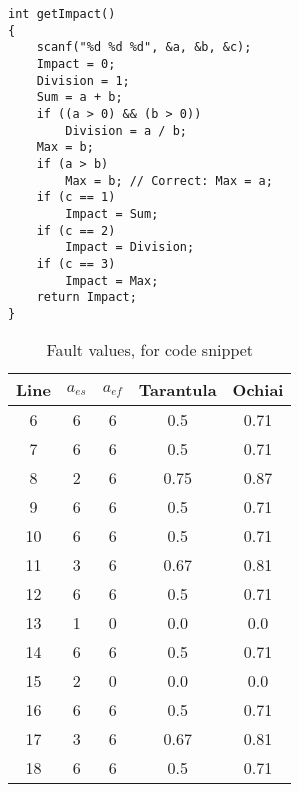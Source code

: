 \begin{lstlisting}[caption={Example code snippet}, label={lst:code_snippet sfl}]
int getImpact()
{
    scanf("%d %d %d", &a, &b, &c);
    Impact = 0;
    Division = 1;
    Sum = a + b;
    if ((a > 0) && (b > 0))
        Division = a / b;
    Max = b;
    if (a > b)
        Max = b; // Correct: Max = a;
    if (c == 1)
        Impact = Sum;
    if (c == 2)
        Impact = Division;
    if (c == 3)
        Impact = Max;
    return Impact;
}
\end{lstlisting}
\begin{table}[!h]
\centering
\begin{tabular}{|c|c|c|c|c|}
\hline
Line & $a_{es}$ & $a_{ef}$ & Tarantula & Ochiai \\
\hline
6 & 6 & 6 & 0.5 & 0.71 \\
7 & 6 & 6 & 0.5 & 0.71 \\
8 & 2 & 6 & 0.75 & 0.87 \\
9 & 6 & 6 & 0.5 & 0.71 \\
10 & 6 & 6 & 0.5 & 0.71 \\
11 & 3 & 6 & 0.67 & 0.81 \\
12 & 6 & 6 & 0.5 & 0.71 \\
13 & 1 & 0 & 0.0 & 0.0 \\
14 & 6 & 6 & 0.5 & 0.71 \\
15 & 2 & 0 & 0.0 & 0.0 \\
16 & 6 & 6 & 0.5 & 0.71 \\
17 & 3 & 6 & 0.67 & 0.81 \\
18 & 6 & 6 & 0.5 & 0.71\\
\hline
\end{tabular}
\caption{Fault values, for code snippet}
\label{tab: sfl}
\end{table}